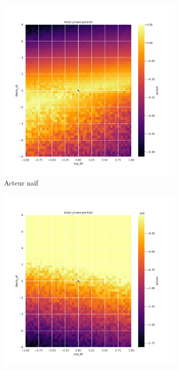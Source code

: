 \begin{figure}[H]
    \centering
    \begin{subfigure}{0.3\textwidth}
        \includegraphics[width=\textwidth]{figures/iteration1/0_actor_discount__ante_Pendulum-v0.pdf}
        \caption{Acteur naïf}
    \end{subfigure}
    \begin{subfigure}{0.3\textwidth}
        \includegraphics[width=\textwidth]{figures/iteration1/0_actor_discount__post_Pendulum-v0.pdf}

\end{subfigure}
\end{figure}
